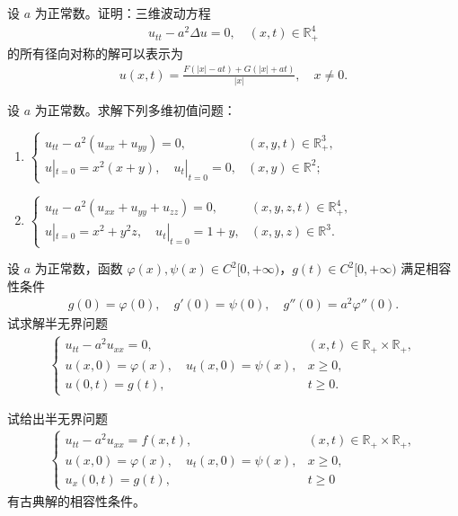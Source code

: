 \documentclass[../../main.tex]{subfiles}%
\begin{document}
\begin{example}
设 $a$ 为正常数。证明：三维波动方程
\begin{align*}
u_{tt}-a^2\Delta u=0,\quad (x,t)\in\mathbb{R}_+^4
\end{align*}
的所有径向对称的解可以表示为
\begin{align*}
u(x,t)=\frac{F(|x|-at)+G(|x|+at)}{|x|},\quad x\neq 0.
\end{align*}
\end{example}

\begin{example}
设 $a$ 为正常数。求解下列多维初值问题：
\begin{enumerate}[(1)]
\item $\begin{cases}
u_{tt}-a^2(u_{xx}+u_{yy})=0, & (x,y,t)\in\mathbb{R}_+^3, \\
u|_{t=0}=x^2(x+y),\quad u_t|_{t=0}=0, & (x,y)\in\mathbb{R}^2;
\end{cases}$
\item $\begin{cases}
u_{tt}-a^2(u_{xx}+u_{yy}+u_{zz})=0, & (x,y,z,t)\in\mathbb{R}_+^4, \\
u|_{t=0}=x^2+y^2z,\quad u_t|_{t=0}=1+y, & (x,y,z)\in\mathbb{R}^3.
\end{cases}$
\end{enumerate}
\end{example}

\begin{example}
设 $a$ 为正常数，函数 $\varphi(x),\psi(x)\in C^2[0,+\infty)$，$g(t)\in C^2[0,+\infty)$ 满足相容性条件
\begin{align*}
g(0)=\varphi(0),\quad g'(0)=\psi(0),\quad g''(0)=a^2\varphi''(0).
\end{align*}
试求解半无界问题
\begin{align*}
\begin{cases}
u_{tt}-a^2u_{xx}=0, & (x,t)\in\mathbb{R}_+\times\mathbb{R}_+, \\
u(x,0)=\varphi(x),\quad u_t(x,0)=\psi(x), & x\geqslant 0, \\
u(0,t)=g(t), & t\geqslant 0.
\end{cases}
\end{align*}
\end{example}

\begin{example}
试给出半无界问题
\begin{align*}
\begin{cases}
u_{tt}-a^2u_{xx}=f(x,t), & (x,t)\in\mathbb{R}_+\times\mathbb{R}_+, \\
u(x,0)=\varphi(x),\quad u_t(x,0)=\psi(x), & x\geqslant 0, \\
u_x(0,t)=g(t), & t\geqslant 0
\end{cases}
\end{align*}
有古典解的相容性条件。
\end{example}
\end{document}
